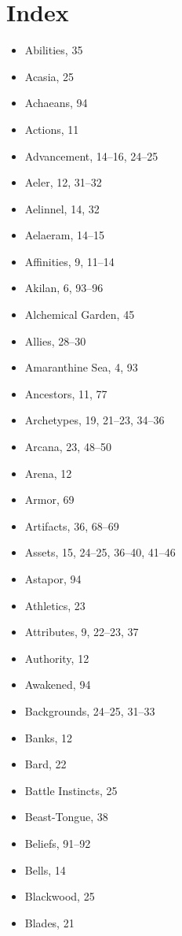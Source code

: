 
\chapter{Index}

\begin{multicols}{2}
\begin{itemize}
  \item Abilities, 35
  \item Acasia, 25
  \item Achaeans, 94
  \item Actions, 11
  \item Advancement, 14--16, 24--25
  \item Aeler, 12, 31--32
  \item Aelinnel, 14, 32
  \item Aelaeram, 14--15
  \item Affinities, 9, 11--14
  \item Akilan, 6, 93--96
  \item Alchemical Garden, 45
  \item Allies, 28--30
  \item Amaranthine Sea, 4, 93
  \item Ancestors, 11, 77
  \item Archetypes, 19, 21--23, 34--36
  \item Arcana, 23, 48--50
  \item Arena, 12
  \item Armor, 69
  \item Artifacts, 36, 68--69
  \item Assets, 15, 24--25, 36--40, 41--46
  \item Astapor, 94
  \item Athletics, 23
  \item Attributes, 9, 22--23, 37
  \item Authority, 12
  \item Awakened, 94
  \item Backgrounds, 24--25, 31--33
  \item Banks, 12
  \item Bard, 22
  \item Battle Instincts, 25
  \item Beast-Tongue, 38
  \item Beliefs, 91--92
  \item Bells, 14
  \item Blackwood, 25
  \item Blades, 21

\end{itemize}
\end{multicols}
